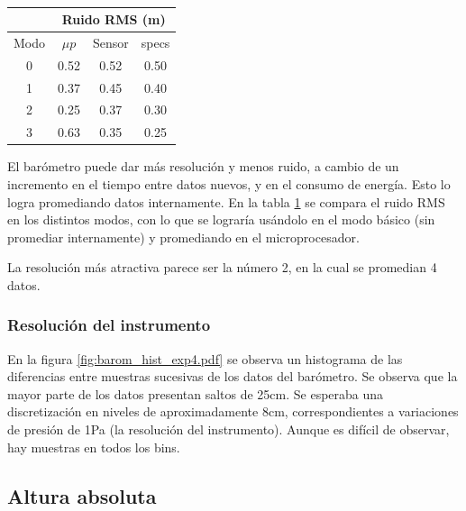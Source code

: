 \documentclass[main]{subfiles}
\begin{document}
\begin{table}
\vspace{-20pt}
\centering
\begin{tabular}{c|c|c|c|} 
\cline{2-4}
	& \multicolumn{3}{|c|}{\cellcolor[gray]{0.8} Ruido RMS  (m)}      \\ \hline
\multicolumn{1}{|c|}{\cellcolor[gray]{0.8} {Modo}} & \cellcolor[gray]{0.8} {$\mu p$} &\cellcolor[gray]{0.8} {Sensor} &\cellcolor[gray]{0.8} {specs}\\ \hline

\multicolumn{1}{|c|}{0}	&	0.52	&	0.52	&	0.50\\
\hline
\multicolumn{1}{|c|}{1}	&	0.37	&	0.45	&	0.40\\
\hline
\multicolumn{1}{|c|}{2}	&	0.25	&	0.37	&	0.30\\
\hline
\multicolumn{1}{|c|}{3}	&	0.63	&	0.35	&	0.25\\
\hline

\end{tabular}
\caption{}
\vspace{-16pt}
\label{tab:ruido-rms}
\end{table}

El bar\'ometro puede dar m\'as resoluci\'on y menos ruido, a cambio de un incremento en el tiempo entre datos nuevos, y en el consumo de energ\'ia. Esto lo logra promediando datos internamente. En la tabla \ref{tab:ruido-rms} se compara el ruido RMS en los distintos modos, con lo que se lograr\'ia us\'andolo en el modo b\'asico (sin promediar internamente) y promediando en el microprocesador.

La resoluci\'on m\'as atractiva parece ser la n\'umero 2, en la cual se promedian 4 datos.

\subsubsection{Resoluci\'on del instrumento}

En la figura \ref{fig:barom_hist_exp4.pdf} se observa un histograma de las diferencias entre muestras sucesivas de los datos del bar\'ometro. Se observa que la mayor parte de los datos presentan saltos de 25cm. Se esperaba una discretizaci\'on en niveles de  aproximadamente 8cm, correspondientes a variaciones de presi\'on de 1Pa (la resoluci\'on del instrumento). Aunque es dif\'icil de observar, hay muestras en todos los bins.

\subsection{Altura absoluta}
\end{document}
